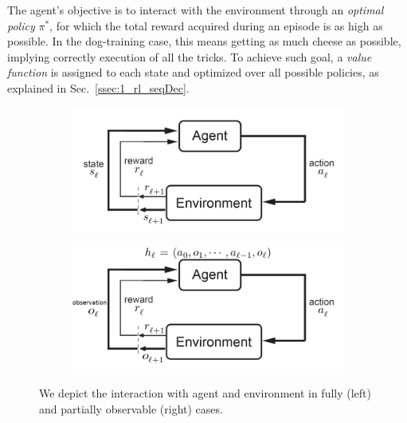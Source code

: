 The agent's objective is to interact with the environment through an \textit{optimal policy} $\pi^{*}$, for which the total reward acquired during an episode is as high as possible. In the dog-training case, this means getting as much cheese as possible, implying correctly execution of all the tricks. To achieve such goal, a \textit{value function} is assigned to each state and optimized over all possible policies, as explained in Sec.~\ref{ssec:1_rl_seqDec}.

\begin{figure}\label{fig:rldep}
\centering
    \begin{subfigure}[t!]{.49\textwidth}
        \centering
        \includegraphics[width=1.\textwidth]{Figures/1rlintro/RL_papernotation.png}
    \end{subfigure}
    \hfill
    \begin{subfigure}[t!]{.49\textwidth}
        \centering
        \includegraphics[width=1.\textwidth]{Figures/1rlintro/RL_papernotation_PO.png}
    \end{subfigure}
\caption{We depict the interaction with agent and environment in fully (left) and partially observable (right) cases.}
\end{figure}

